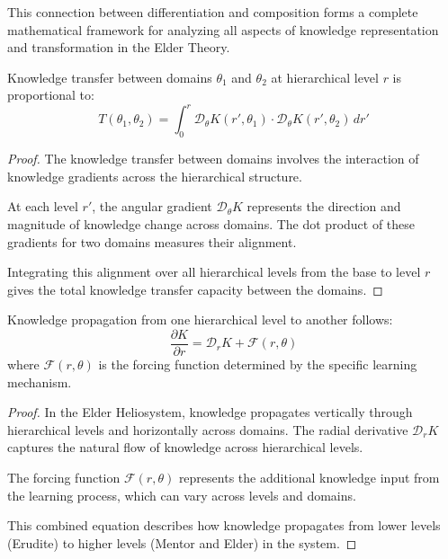This connection between differentiation and composition forms a complete mathematical framework for analyzing all aspects of knowledge representation and transformation in the Elder Theory.

\begin{theorem}
Knowledge transfer between domains $\theta_1$ and $\theta_2$ at hierarchical level $r$ is proportional to:
\begin{equation}
T(\theta_1, \theta_2) = \int_0^r \mathcal{D}_\theta K(r',\theta_1) \cdot \mathcal{D}_\theta K(r',\theta_2) \, dr'
\end{equation}
\end{theorem}

\begin{proof}
The knowledge transfer between domains involves the interaction of knowledge gradients across the hierarchical structure.

At each level $r'$, the angular gradient $\mathcal{D}_\theta K$ represents the direction and magnitude of knowledge change across domains. The dot product of these gradients for two domains measures their alignment.

Integrating this alignment over all hierarchical levels from the base to level $r$ gives the total knowledge transfer capacity between the domains.
\end{proof}

\begin{theorem}
Knowledge propagation from one hierarchical level to another follows:
\begin{equation}
\frac{\partial K}{\partial r} = \mathcal{D}_r K + \mathcal{F}(r,\theta)
\end{equation}
where $\mathcal{F}(r,\theta)$ is the forcing function determined by the specific learning mechanism.
\end{theorem}

\begin{proof}
In the Elder Heliosystem, knowledge propagates vertically through hierarchical levels and horizontally across domains. The radial derivative $\mathcal{D}_r K$ captures the natural flow of knowledge across hierarchical levels.

The forcing function $\mathcal{F}(r,\theta)$ represents the additional knowledge input from the learning process, which can vary across levels and domains.

This combined equation describes how knowledge propagates from lower levels (Erudite) to higher levels (Mentor and Elder) in the system.
\end{proof}

